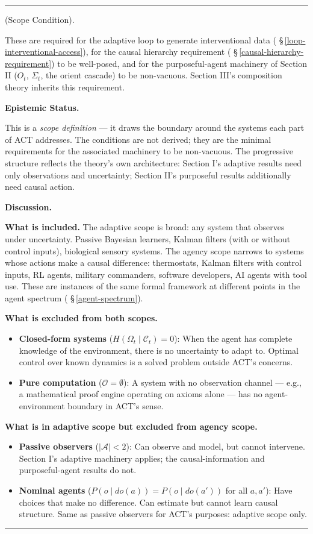\documentclass[11pt,oneside]{article}
\newcounter{claim}[section]
\renewcommand{\theclaim}{\thesection.\arabic{claim}}
\newenvironment{segment}[2]{%
  \refstepcounter{claim}%
  \bigskip\noindent\hrule\smallskip
  \noindent{\bfseries #1~\theclaim}\enskip(#2).\par\smallskip
  \noindent\ignorespaces
}{%
  \par\smallskip\noindent\hrule\bigskip
}
\newenvironment{scope}[1][]{\begin{segment}{Scope}{#1}}{\end{segment}}
\begin{document}
\begin{scope}[Scope Condition]
These are required for the adaptive loop to generate interventional data ( \S\,\ref{loop-interventional-access}), for the causal hierarchy requirement ( \S\,\ref{causal-hierarchy-requirement}) to be well-posed, and for the purposeful-agent machinery of Section II ($O_t$, $\Sigma_t$, the orient cascade) to be non-vacuous. Section III's composition theory inherits this requirement.


\medskip\noindent\textbf{Epistemic Status.}


This is a \textit{scope definition} — it draws the boundary around the systems each part of ACT addresses. The conditions are not derived; they are the minimal requirements for the associated machinery to be non-vacuous. The progressive structure reflects the theory's own architecture: Section I's adaptive results need only observations and uncertainty; Section II's purposeful results additionally need causal action.


\medskip\noindent\textbf{Discussion.}


\textbf{What is included.} The adaptive scope is broad: any system that observes under uncertainty. Passive Bayesian learners, Kalman filters (with or without control inputs), biological sensory systems. The agency scope narrows to systems whose actions make a causal difference: thermostats, Kalman filters with control inputs, RL agents, military commanders, software developers, AI agents with tool use. These are instances of the same formal framework at different points in the agent spectrum ( \S\,\ref{agent-spectrum}).

\textbf{What is excluded from both scopes.}

\begin{itemize}
  \item \textbf{Closed-form systems} ($H(\Omega_t \mid \mathcal C_t) = 0$): When the agent has complete knowledge of the environment, there is no uncertainty to adapt to. Optimal control over known dynamics is a solved problem outside ACT's concerns.
  \item \textbf{Pure computation} ($\mathcal O = \emptyset$): A system with no observation channel — e.g., a mathematical proof engine operating on axioms alone — has no agent-environment boundary in ACT's sense.
\end{itemize}


\textbf{What is in adaptive scope but excluded from agency scope.}

\begin{itemize}
  \item \textbf{Passive observers} ($\lvert\mathcal A\rvert < 2$): Can observe and model, but cannot intervene. Section I's adaptive machinery applies; the causal-information and purposeful-agent results do not.
  \item \textbf{Nominal agents} ($P(o \mid do(a)) = P(o \mid do(a'))$ for all $a, a'$): Have choices that make no difference. Can estimate but cannot learn causal structure. Same as passive observers for ACT's purposes: adaptive scope only.
\end{itemize}



\end{scope}
\end{document}
